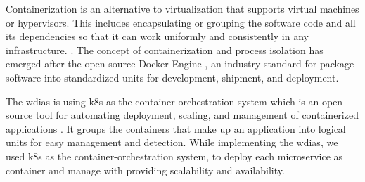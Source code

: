 



Containerization is an alternative to virtualization that supports virtual machines or hypervisors. This includes encapsulating or grouping the software code and all its dependencies so that it can work uniformly and consistently in any infrastructure. \cite{IBMContainerizationExplained}. The concept of containerization and process isolation has emerged after the open-source Docker Engine \cite{DockerAppContainerization}, an industry standard for package software into standardized units for development, shipment, and deployment.

The \acrshort{wdias} is using \acrfull{k8s} as the container orchestration system which is an open-source tool for automating deployment, scaling, and management of containerized applications \cite{LinuxFoundationProduction-GradeKubernetes}. It groups the containers that make up an application into logical units for easy management and detection. While implementing the \acrshort{wdias}, we used \acrshort{k8s} as the container-orchestration system, to deploy each microservice as container and manage with providing scalability and availability.

